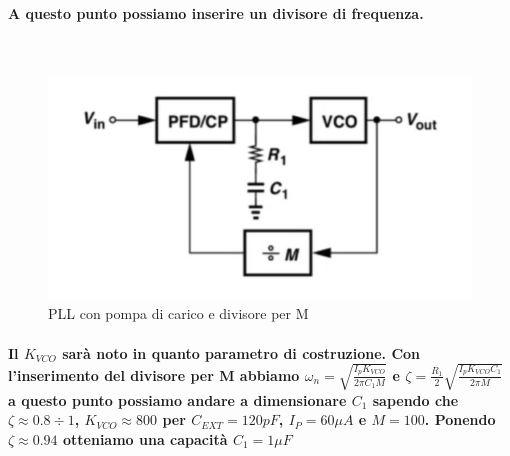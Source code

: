 \documentclass{article}
\begin{document}
\paragraph{A questo punto possiamo inserire un divisore di frequenza.}
~\begin{figure}[!h]%
\includegraphics[scale=0.6]{DivM.png} 
\caption{PLL con pompa di carico e divisore per M}
\label{fig:foo}
\end{figure}
\paragraph{Il $K_{VCO}$ sarà noto in quanto parametro di costruzione.
Con l'inserimento del divisore per M abbiamo $\omega _n=\sqrt{\frac{I_p K_{VCO}}{2 \pi C_1M} }$ e $\zeta=\frac{R_1}{2}\sqrt{\frac{I_p K_{VCO}C_1}{2\pi M}}$ a questo punto possiamo andare a dimensionare $C_1$ sapendo che\\ $\zeta \approx0.8 \div 1$, $K_{VCO}\approx800$ per $C_{EXT}=120pF$, $I_P=60\mu A$ e $M=100$.
Ponendo $\zeta \approx0.94$ otteniamo una capacità $C_1=1\mu F$  }
 
\end{document}

